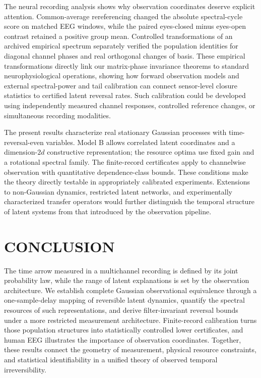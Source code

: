 \documentclass[aps,pre,reprint,amsmath,amssymb,superscriptaddress]{revtex4-2}
\begin{document}
The neural recording analysis shows why observation coordinates deserve explicit attention. Common-average rereferencing changed the absolute spectral-cycle score on matched EEG windows, while the paired eyes-closed minus eyes-open contrast retained a positive group mean. Controlled transformations of an archived empirical spectrum separately verified the population identities for diagonal channel phases and real orthogonal changes of basis. These empirical transformations directly link our matrix-phase invariance theorems to standard neurophysiological operations, showing how forward observation models and external spectral-power and tail calibration can connect sensor-level closure statistics to certified latent reversal rates. Such calibration could be developed using independently measured channel responses, controlled reference changes, or simultaneous recording modalities.

The present results characterize real stationary Gaussian processes with time-reversal-even variables. Model B allows correlated latent coordinates and a dimension-$2d$ constructive representation; the resource optima use fixed gain and a rotational spectral family. The finite-record certificates apply to channelwise observation with quantitative dependence-class bounds. These conditions make the theory directly testable in appropriately calibrated experiments. Extensions to non-Gaussian dynamics, restricted latent networks, and experimentally characterized transfer operators would further distinguish the temporal structure of latent systems from that introduced by the observation pipeline.

\section{CONCLUSION}

The time arrow measured in a multichannel recording is defined by its joint probability law, while the range of latent explanations is set by the observation architecture. We establish complete Gaussian observational equivalence through a one-sample-delay mapping of reversible latent dynamics, quantify the spectral resources of such representations, and derive filter-invariant reversal bounds under a more restricted measurement architecture. Finite-record calibration turns those population structures into statistically controlled lower certificates, and human EEG illustrates the importance of observation coordinates. Together, these results connect the geometry of measurement, physical resource constraints, and statistical identifiability in a unified theory of observed temporal irreversibility.
\end{document}
